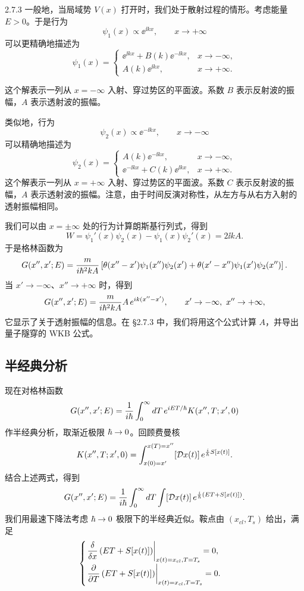 \begin{example}{2.7.3}
  一般地，当局域势 $V(x)$ 打开时，我们处于散射过程的情形。考虑能量 $E>0$。于是行为
  \[
  \psi_1(x)\propto\ee^{\ii kx},\qquad x\to+\infty
  \]
  可以更精确地描述为
  \[
  \psi_1(x)=
  \begin{cases}
  \ee^{\ii kx}+B(k)\ee^{-\ii kx}, & x\to-\infty,\\[1mm]
  A(k)\ee^{\ii kx}, & x\to+\infty.
  \end{cases}
  \]

  这个解表示一列从 $x=-\infty$ 入射、穿过势区的平面波。系数 $B$ 表示反射波的振幅，$A$ 表示透射波的振幅。

  类似地，行为
  \[
  \psi_2(x)\propto\ee^{-\ii kx},\qquad x\to-\infty
  \]
  可以精确地描述为
  \[
  \psi_2(x)=
  \begin{cases}
  A(k)\ee^{-\ii kx}, & x\to-\infty,\\[1mm]
  \ee^{-\ii kx}+C(k)\ee^{\ii kx}, & x\to+\infty.
  \end{cases}
  \]
  这个解表示一列从 $x=+\infty$ 入射、穿过势区的平面波。系数 $C$ 表示反射波的振幅，$A$ 表示透射波的振幅。注意，由于时间反演对称性，从左方与从右方入射的透射振幅相同。

  我们可以由 $x=\pm\infty$ 处的行为计算朗斯基行列式，得到
  \[
  W=\psi_1'(x)\psi_2(x)-\psi_1(x)\psi_2'(x)=2\ii kA.
  \]
  于是格林函数为
  \[
  G(x'',x';E)=\frac{m}{i\hbar^2kA}
  \left[\theta(x''-x')\psi_1(x'')\psi_2(x')
  +\theta(x'-x'')\psi_1(x')\psi_2(x'')\right].
  \]
  当 $x'\to-\infty$、$x''\to+\infty$ 时，得到
  \[
  G(x'',x';E)=\frac{m}{i\hbar^2kA}A\,e^{i k(x''-x')},
  \qquad x'\to-\infty,\ x''\to+\infty,
  \]
  它显示了关于透射振幅的信息。在 §2.7.3 中，我们将用这个公式计算 $A$，并导出量子隧穿的 WKB 公式。
\end{example}

\subsection{半经典分析}

现在对格林函数
\[
G(x'',x';E)=\frac1{i\hbar}\int_0^{\infty}d T\,
e^{i ET/\hbar}K(x'',T;x',0)
\]
作半经典分析，取渐近极限 $\hbar\to0$。回顾费曼核
\[
K(x'',T;x',0)=\int_{x(0)=x'}^{x(T)=x''}[\mathcal{D}x(t)]\,
e^{\frac{i}{\hbar}S[x(t)]}.
\]
结合上述两式，得到
\[
G(x'',x';E)=\frac1{i\hbar}\int_0^{\infty}d T\int[\mathcal{D}x(t)]\,
e^{\frac{i}{\hbar}\left(ET+S[x(t)]\right)}.
\]
我们用最速下降法考虑 $\hbar\to0$ 极限下的半经典近似。鞍点由 $(x_{cl},T_s)$ 给出，满足
\[
\begin{cases}
\left.\dfrac{\delta}{\delta x}\left(ET+S[x(t)]\right)\right|_{x(t)=x_{cl},T=T_s}=0,\\[3mm]
\left.\dfrac{\partial}{\partial T}\left(ET+S[x(t)]\right)\right|_{x(t)=x_{cl},T=T_s}=0.
\end{cases}
\]

